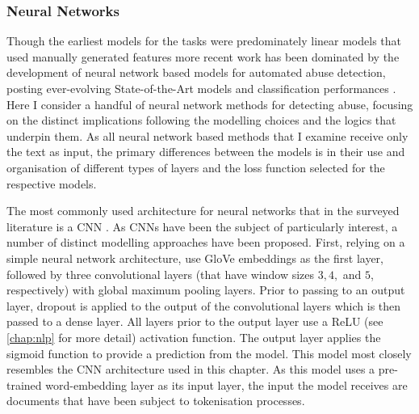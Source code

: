 \subsubsection{Neural Networks}\label{sec:liwc_nn}
Though the earliest models for the tasks were predominately linear models that used manually generated features \citep{Waseem-Hovy:2016,Davidson:2017,Warner:2012} more recent work has been dominated by the development of neural network based models for automated abuse detection, posting ever-evolving State-of-the-Art models and classification performances \citep[e.g.]{Park:2017,Badjatiya:2017,Zimmerman:2018,Stoop:2019,Isaksen:2020}. Here I consider a handful of neural network methods for detecting abuse, focusing on the distinct implications following the modelling choices and the logics that underpin them. As all neural network based methods that I examine receive only the text as input, the primary differences between the models is in their use and organisation of different types of layers and the loss function selected for the respective models.

The most commonly used architecture for neural networks that in the surveyed literature is a CNN \citep{Park:2017,Gamback:2017,Wulczyn:2017,Kolhatkar:2021,Zimmerman:2018,Wang:2020}. As CNNs have been the subject of particularly interest, a number of distinct modelling approaches have been proposed. First, relying on a simple neural network architecture, \citet{Kolhatkar:2021} use GloVe embeddings as the first layer, followed by three convolutional layers (that have window sizes $3, 4,$ and $5$, respectively) with global maximum pooling layers. Prior to passing to an output layer, dropout is applied to the output of the convolutional layers which is then passed to a dense layer. All layers prior to the output layer use a ReLU (see \cref{chap:nlp} for more detail) activation function. The output layer applies the sigmoid function to provide a prediction from the model. This model most closely resembles the CNN architecture used in this chapter. As this model uses a pre-trained word-embedding layer as its input layer, the input the model receives are documents that have been subject to tokenisation processes.

